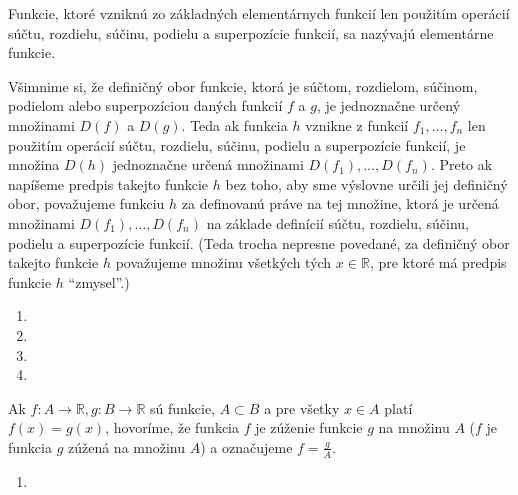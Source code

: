 Funkcie, ktoré vzniknú zo základných elementárnych funkcií len použitím
operácií súčtu, rozdielu, súčinu, podielu a superpozície funkcií, sa nazývajú
elementárne funkcie.

Všimnime si, že definičný obor funkcie, ktorá je súčtom, rozdielom, súčinom,
podielom alebo superpozíciou daných funkcií $f$ a $g$, je jednoznačne určený
množinami $D(f)$ a $D(g)$. Teda ak funkcia $h$ vznikne z funkcií
$f_1,\ldots,f_n$ len použitím operácií súčtu, rozdielu, súčinu, podielu a
superpozície funkcií, je množina $D(h)$ jednoznačne určená množinami
$D(f_1),\ldots,D(f_n)$. Preto ak napíšeme predpis takejto funkcie $h$ bez toho,
aby sme výslovne určili jej definičný obor, považujeme funkciu $h$ za
definovanú práve na tej množine, ktorá je určená množinami
$D(f_1),\ldots,D(f_n)$ na základe definícií súčtu, rozdielu, súčinu, podielu a
superpozície funkcií. (Teda trocha nepresne povedané, za definičný obor takejto
funkcie $h$ považujeme množinu všetkých tých $x\in\mathbb{R}$, pre ktoré má
predpis funkcie $h$ \enquote{zmysel}.)

\begin{enumerate}[resume]
  \item {}
  \item {}
  \item {}
  \item {}
\end{enumerate}

Ak $f: A \rightarrow \mathbb{R}, g: B \rightarrow \mathbb{R}$ sú funkcie, $A
\subset B$ a pre všetky $x \in A$ platí $f(x) = g(x)$, hovoríme, že funkcia $f$
je zúženie funkcie $g$ na množinu $A$ ($f$ je funkcia $g$ zúžená na množinu
$A$) a označujeme $f = \frac{g}{A}$.

\begin{enumerate}[resume]
  \item {}
\end{enumerate}
